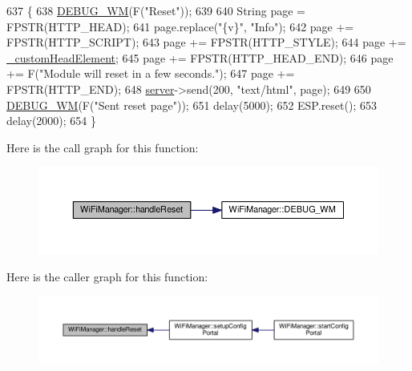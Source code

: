 \begin{DoxyCode}
637                               \{
638   \hyperlink{class_wi_fi_manager_ae5f595c670ccbcf9a191baf50f5c7c26}{DEBUG\_WM}(F(\textcolor{stringliteral}{"Reset"}));
639 
640   String page = FPSTR(HTTP\_HEAD);
641   page.replace(\textcolor{stringliteral}{"\{v\}"}, \textcolor{stringliteral}{"Info"});
642   page += FPSTR(HTTP\_SCRIPT);
643   page += FPSTR(HTTP\_STYLE);
644   page += \hyperlink{class_wi_fi_manager_a8860012564a62209d750c50e56319192}{\_customHeadElement};
645   page += FPSTR(HTTP\_HEAD\_END);
646   page += F(\textcolor{stringliteral}{"Module will reset in a few seconds."});
647   page += FPSTR(HTTP\_END);
648   \hyperlink{class_wi_fi_manager_a509523a01c0395cf0dc235b074f2a5ea}{server}->send(200, \textcolor{stringliteral}{"text/html"}, page);
649 
650   \hyperlink{class_wi_fi_manager_ae5f595c670ccbcf9a191baf50f5c7c26}{DEBUG\_WM}(F(\textcolor{stringliteral}{"Sent reset page"}));
651   delay(5000);
652   ESP.reset();
653   delay(2000);
654 \}
\end{DoxyCode}
Here is the call graph for this function\+:\nopagebreak
\begin{figure}[H]
\begin{center}
\leavevmode
\includegraphics[width=350pt]{d4/dc8/class_wi_fi_manager_a94fb1a8fcfbd0d02714c69138bf72f9c_cgraph}
\end{center}
\end{figure}
Here is the caller graph for this function\+:\nopagebreak
\begin{figure}[H]
\begin{center}
\leavevmode
\includegraphics[width=350pt]{d4/dc8/class_wi_fi_manager_a94fb1a8fcfbd0d02714c69138bf72f9c_icgraph}
\end{center}
\end{figure}
\mbox{\label{class_wi_fi_manager_a47e4c7df7478f690c53ff9f5125c9760}} 

